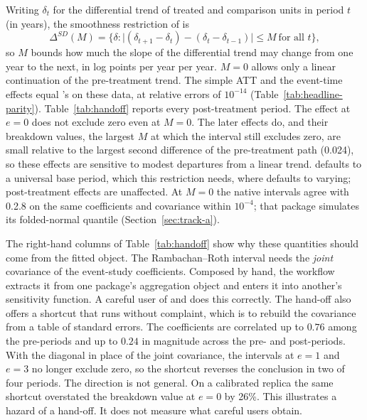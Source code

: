 Writing \(\delta_t\) for the differential trend of treated and
comparison units in period \(t\) (in years), the smoothness restriction
of \citet{rambachan2023more} is
\begin{equation}\label{eq:delta-sd}
  \Delta^{SD}(M) = \bigl\{\delta : \bigl|(\delta_{t+1}-\delta_t) -
  (\delta_t-\delta_{t-1})\bigr| \le M \ \text{for all } t\bigr\},
\end{equation}
so \(M\) bounds how much the slope of the differential trend may change
from one year to the next, in log points per year per year. \(M=0\)
allows only a linear continuation of the pre-treatment trend. The
simple ATT and the event-time effects equal 's on these data, at
relative errors of \(10^{-14}\) (Table~\ref{tab:headline-parity}).
Table~\ref{tab:handoff} reports every post-treatment period. The effect
at \(e=0\) does not exclude zero even at \(M=0\). The later effects do, and
their breakdown values, the largest \(M\) at which the interval still
excludes zero, are small relative to the largest second difference of the
pre-treatment path (0.024), so these effects are sensitive to modest departures
from a linear trend.  defaults to a universal base
period, which this restriction needs, where  defaults to varying;
post-treatment effects are unaffected. At \(M=0\) the native intervals
agree with   0.2.8 on the same coefficients and
covariance within \(10^{-4}\); that package simulates its folded-normal
quantile (Section~\ref{sec:track-a}).

\begin{table}[!ht]
\centering\small

\caption{Rambachan--Roth sensitivity on the original ,
all post-treatment event times. The interval is the 95\% fixed-length
confidence interval at \(M=0\), and the breakdown value is the largest
\(M\) at which it excludes zero (0 means it does not at \(M=0\)). The left
pair uses the joint covariance the fit carries; the right pair uses the
diagonal rebuilt from reported standard errors.}
\label{tab:handoff}
\end{table}

The right-hand columns of Table~\ref{tab:handoff} show why these
quantities should come from the fitted object. The Rambachan--Roth
interval needs the \emph{joint} covariance of the event-study coefficients.
Composed by hand, the workflow extracts it from one package's aggregation
object and enters it into another's sensitivity function. A careful user
of  and  does this correctly. The hand-off also
offers a shortcut that runs without complaint, which is to rebuild the
covariance from a table of standard errors. The coefficients are
correlated up to \(0.76\) among the pre-periods and up to \(0.24\) in
magnitude across the pre- and post-periods. With the diagonal in place of
the joint covariance, the intervals at \(e=1\) and \(e=3\) no longer exclude
zero, so the shortcut reverses the conclusion in two of four periods. The
direction is not general. On a calibrated replica the same shortcut
overstated the breakdown value at \(e=0\) by 26\%. This illustrates a
hazard of a hand-off. It does not measure what careful users obtain.

